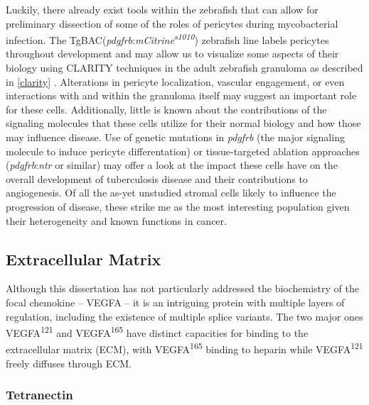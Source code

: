 Luckily, there already exist tools within the zebrafish that can allow for preliminary dissection of some of the roles of pericytes during mycobacterial infection. The TgBAC(\textit{pdgfrb}:\textit{mCitrine\textsuperscript{s1010}}) zebrafish line labels pericytes throughout development and may allow us to visualize some aspects of their biology using CLARITY techniques in the adult zebrafish granuloma as described in \autoref{clarity} \citep{Vanhollebeke2015}. Alterations in pericyte localization, vascular engagement, or even interactions with and within the granuloma itself may suggest an important role for these cells. Additionally, little is known about the contributions of the signaling molecules that these cells utilize for their normal biology and how those may influence disease. Use of genetic mutations in \textit{pdgfrb} (the major signaling molecule to induce pericyte differentation) or tissue-targeted ablation approaches (\textit{pdgfrb}:\textit{ntr} or similar) may offer a look at the impact these cells have on the overall development of tuberculosis disease and their contributions to angiogenesis. Of all the as-yet unstudied stromal cells likely to influence the progression of disease, these strike me as the most interesting population given their heterogeneity and known functions in cancer.

\subsection{Extracellular Matrix}

Although this dissertation has not particularly addressed the biochemistry of the focal chemokine -- VEGFA -- it is an intriguing protein with multiple layers of regulation, including the existence of multiple splice variants. The two major ones VEGFA\textsuperscript{121} and VEGFA\textsuperscript{165} have distinct capacities for binding to the extracellular matrix (ECM), with VEGFA\textsuperscript{165} binding to heparin while VEGFA\textsuperscript{121} freely diffuses through ECM. 

\subsubsection{Tetranectin}


